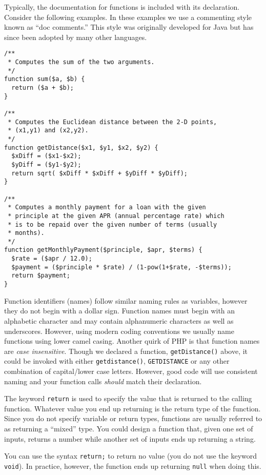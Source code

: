 Typically, the documentation for functions is included with its
declaration.  Consider the following examples.  In these examples 
we use a commenting style known as ``doc comments.'' This 
style was originally developed for Java but has since been 
adopted by many other languages.

\begin{verbatim}
/**
 * Computes the sum of the two arguments.
 */
function sum($a, $b) {
  return ($a + $b);
}

/**
 * Computes the Euclidean distance between the 2-D points, 
 * (x1,y1) and (x2,y2).
 */
function getDistance($x1, $y1, $x2, $y2) {
  $xDiff = ($x1-$x2);
  $yDiff = ($y1-$y2);
  return sqrt( $xDiff * $xDiff + $yDiff * $yDiff);
}

/**
 * Computes a monthly payment for a loan with the given
 * principle at the given APR (annual percentage rate) which
 * is to be repaid over the given number of terms (usually
 * months).
 */
function getMonthlyPayment($principle, $apr, $terms) {
  $rate = ($apr / 12.0);
  $payment = ($principle * $rate) / (1-pow(1+$rate, -$terms));
  return $payment;
}
\end{verbatim}

Function identifiers (names) follow similar naming rules as 
variables, however they do not begin with a dollar sign.  
Function names must begin with an alphabetic character 
and may contain alphanumeric characters as well as 
underscores.  However, using modern coding conventions 
we usually name functions using lower camel casing.  Another
quirk of PHP is that function names are \emph{case insensitive}.
Though we declared a function, \texttt{getDistance()}
above, it could be invoked with either \texttt{getdistance()}, 
\texttt{GETDISTANCE} or any other combination of
capital/lower case letters.  However, good code will use consistent
naming and your function calls \emph{should} match their
declaration.

The keyword \texttt{return} is used to specify the value
that is returned to the calling function.  Whatever value you end
up returning is the return type of the function.  Since you do not
specify variable or return types, functions are usually referred
to as returning a ``mixed'' type.  You could design a function that,
given one set of inputs, returns a number while another set of
inputs ends up returning a string.  

You can use the syntax \texttt{return;} to return no
value (you do not use the keyword \texttt{void}).  
In practice, however, the function ends up returning 
\texttt{null} when doing this.  

